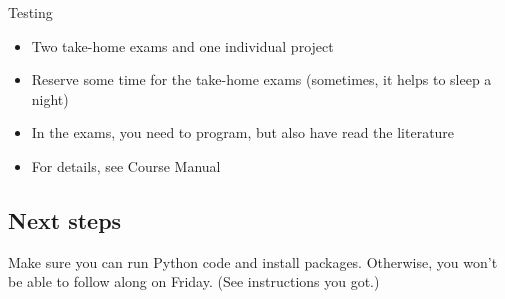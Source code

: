\begin{frame}{Testing}
\begin{itemize}
	\item Two take-home exams and one individual project
	\item Reserve some time for the take-home exams (sometimes, it helps to sleep a night)
	\item In the exams, you need to program, but also have read the literature
	\item For details, see Course Manual
\end{itemize}
\end{frame}


\subsection{Next steps}




\begin{frame}[standout]
	Make sure you can run Python code and install packages. Otherwise, you won't be able to follow along on Friday. (See instructions you got.)
\end{frame}


\begin{frame}
	\printbibliography
\end{frame}




